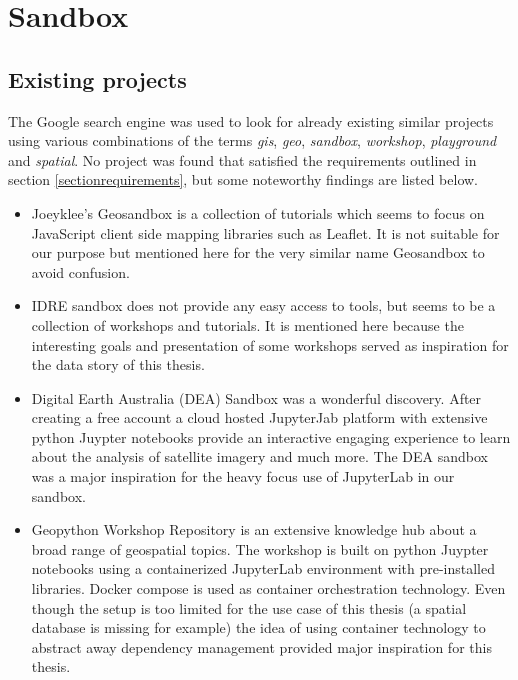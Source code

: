 \documentclass[11pt, a4paper, oneside, parskip=full-]{scrartcl}
\begin{document}
\section{Sandbox}

\subsection{Existing projects}
The Google search engine was used to look for already existing similar projects
using various combinations of the terms \emph{gis}, \emph{geo}, \emph{sandbox},
\emph{workshop}, \emph{playground} and \emph{spatial}. No project was found that
satisfied the requirements outlined in section \ref{sectionrequirements}, but
some noteworthy findings are listed below.

\begin{itemize}
  \item Joeyklee's Geosandbox\cite{project-joeyklee} is a collection of
  tutorials which seems to focus on JavaScript client side mapping libraries
  such as Leaflet. It is not suitable for our purpose but mentioned here for the
  very similar name Geosandbox to avoid confusion.
  \item IDRE sandbox\cite{project-idre} does not provide any easy access to
  tools, but seems to be a collection of workshops and tutorials. It is
  mentioned here because the interesting goals and presentation of some
  workshops served as inspiration for the data story of this thesis.
  \item Digital Earth Australia (DEA) Sandbox\cite{project-dea} was a wonderful
  discovery. After creating a free account a cloud hosted JupyterJab platform
  with extensive python Juypter notebooks provide an interactive engaging
  experience to learn about the analysis of satellite imagery and much more. The
  DEA sandbox was a major inspiration for the heavy focus use of
  JupyterLab\cite{jupyterlab} in our sandbox.
  \item Geopython Workshop Repository\cite{project-geopython} is an extensive
  knowledge hub about a broad range of geospatial topics. The workshop is built
  on python Juypter notebooks using a containerized JupyterLab environment with
  pre-installed libraries. Docker compose is used as container orchestration
  technology. Even though the setup is too limited for the use case of this
  thesis (a spatial database is missing for example) the idea of using container
  technology to abstract away dependency management provided major inspiration
  for this thesis.
\end{itemize}
\end{document}
